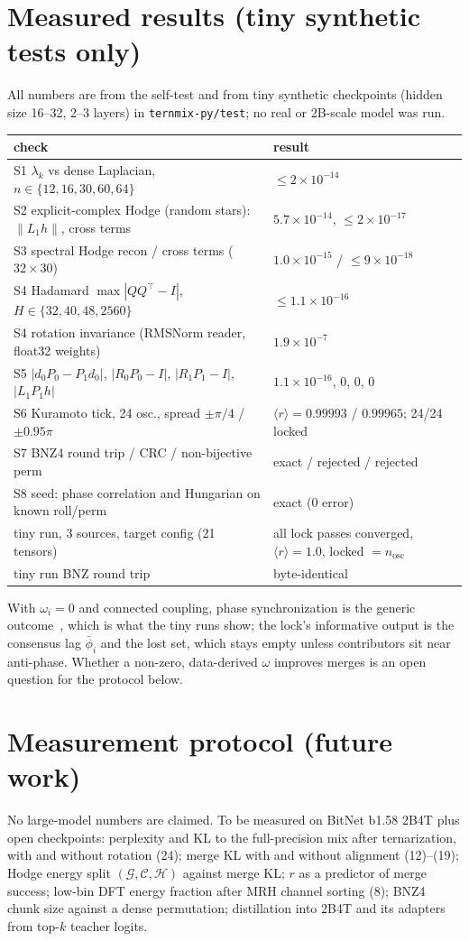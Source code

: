 \documentclass[11pt]{article}
\begin{document}
\section{Measured results (tiny synthetic tests only)}
All numbers are from the self-test and from tiny synthetic checkpoints (hidden size 16--32, 2--3 layers) in \texttt{ternmix-py/test}; no real or 2B-scale model was run.
\begin{center}\footnotesize\begin{tabular}{ll}\toprule
check&result\\\midrule
S1 $\lambda_k$ vs dense Laplacian, $n\in\{12,16,30,60,64\}$&$\le 2\times10^{-14}$\\
S2 explicit-complex Hodge (random stars): $\|L_1h\|$, cross terms&$5.7\times10^{-14}$, $\le 2\times10^{-17}$\\
S3 spectral Hodge recon / cross terms ($32{\times}30$)&$1.0\times10^{-15}$ / $\le 9\times10^{-18}$\\
S4 Hadamard $\max|QQ^\top-I|$, $H\in\{32,40,48,2560\}$&$\le1.1\times10^{-16}$\\
S4 rotation invariance (RMSNorm reader, float32 weights)&$1.9\times10^{-7}$\\
S5 $|d_0P_0-P_1d_0|$, $|R_0P_0-I|$, $|R_1P_1-I|$, $|L_1P_1h|$&$1.1\times10^{-16}$, 0, 0, 0\\
S6 Kuramoto tick, 24 osc., spread $\pm\pi/4$ / $\pm0.95\pi$&$\langle r\rangle=0.99993$ / $0.99965$; 24/24 locked\\
S7 BNZ4 round trip / CRC / non-bijective perm&exact / rejected / rejected\\
S8 seed: phase correlation and Hungarian on known roll/perm&exact (0 error)\\
tiny run, 3 sources, target config (21 tensors)&all lock passes converged, $\langle r\rangle=1.0$, locked $=n_{\mathrm{osc}}$\\
tiny run BNZ round trip&byte-identical\\\bottomrule\end{tabular}\end{center}
With $\omega_i=0$ and connected coupling, phase synchronization is the generic outcome~\cite{dorflerbullo,strogatz}, which is what the tiny runs show; the lock's informative output is the consensus lag $\bar\phi_i$ and the lost set, which stays empty unless contributors sit near anti-phase. Whether a non-zero, data-derived $\omega$ improves merges is an open question for the protocol below.

\section{Measurement protocol (future work)}\label{sec:protocol}
No large-model numbers are claimed. To be measured on BitNet b1.58 2B4T plus open checkpoints: perplexity and KL to the full-precision mix after ternarization, with and without rotation (24); merge KL with and without alignment (12)--(19); Hodge energy split $(\mathcal G,\mathcal C,\mathcal H)$ against merge KL; $r$ as a predictor of merge success; low-bin DFT energy fraction after MRH channel sorting (8); BNZ4 chunk size against a dense permutation; distillation into 2B4T and its adapters from top-$k$ teacher logits.
\end{document}
